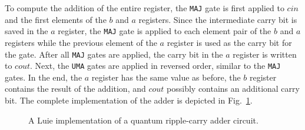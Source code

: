 To compute the addition of the entire register, the \texttt{MAJ} gate is first applied to $cin$ and the first elements of the $b$ and $a$ registers. Since the intermediate carry bit is saved in the $a$ register, the \texttt{MAJ} gate is applied to each element pair of the $b$ and $a$ registers while the previous element of the $a$ register is used as the carry bit for the gate. After all \texttt{MAJ} gates are applied, the carry bit in the $a$ register is written to $cout$. Next, the \texttt{UMA} gates are applied in reversed order, similar to the \texttt{MAJ} gates. In the end, the $a$ register has the same value as before, the $b$ register contains the result of the addition, and $cout$ possibly contains an additional carry bit. The complete implementation of the adder is depicted in Fig.~\ref{fig:eval_adder_luie}.

\begin{figure}[htp]
    \centering     
    
    \caption{A Luie implementation of a quantum ripple-carry adder circuit.}
    \label{fig:eval_adder_luie}
\end{figure}





